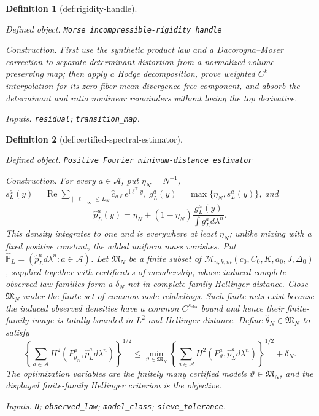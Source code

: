 \documentclass{article}
\newtheorem{definition}{Definition}
\begin{document}
\begin{definition}[def:rigidity-handle]\label{def:rigidity-handle}
\par\smallskip\noindent\emph{Defined object.} \texttt{Morse incompressible-\allowbreak{}rigidity handle}
\par\smallskip\noindent\emph{Construction.} First use the synthetic product law and a Dacorogna--Moser correction to separate determinant distortion from a normalized volume-preserving map; then apply a Hodge decomposition, prove weighted \(C^k\) interpolation for its zero-fiber-mean divergence-free component, and absorb the determinant and ratio nonlinear remainders without losing the top derivative.
\par\smallskip\noindent\emph{Inputs.} \texttt{residual}; \texttt{transition\_\allowbreak{}map}.
\end{definition}

\begin{definition}[def:certified-spectral-estimator]\label{def:certified-spectral-estimator}
\par\smallskip\noindent\emph{Defined object.} \texttt{Positive Fourier minimum-\allowbreak{}distance estimator}
\par\smallskip\noindent\emph{Construction.} For every \(a\in\mathcal A\), put \(\eta_N=N^{-1}\), \(s_L^a(y)=\operatorname{Re}\sum_{\|\ell\|_\infty\le L_N}\widehat c_{a\ell}e^{\mathrm i\ell^\top y}\), \(g_L^a(y)=\max\{\eta_N,s_L^a(y)\}\), and
\[
\widehat p_L^a(y)=\eta_N+(1-\eta_N)\frac{g_L^a(y)}{\int g_L^a d\lambda^n}.
\]
This density integrates to one and is everywhere at least \(\eta_N\); unlike mixing with a fixed positive constant, the added uniform mass vanishes. Put \(\widehat{\mathbb P}_L=(\widehat p_L^a d\lambda^n:a\in\mathcal A)\). Let \(\mathfrak M_N\) be a finite subset of \(\mathcal M_{n,k,m}(c_0,C_0,K,a_0,J,\Delta_0)\), supplied together with certificates of membership, whose induced complete observed-law families form a \(\delta_N\)-net in complete-family Hellinger distance. Close \(\mathfrak M_N\) under the finite set of common node relabelings. Such finite nets exist because the induced observed densities have a common \(C^{s_{\mathrm{obs}}}\) bound and hence their finite-family image is totally bounded in \(L^2\) and Hellinger distance. Define \(\widehat\theta_N\in\mathfrak M_N\) to satisfy
\[
\left\{\sum_{a\in\mathcal A}H^2(P_{\widehat\theta_N}^a,\widehat p_L^a d\lambda^n)\right\}^{1/2}
\le
\min_{\vartheta\in\mathfrak M_N}
\left\{\sum_{a\in\mathcal A}H^2(P_\vartheta^a,\widehat p_L^a d\lambda^n)\right\}^{1/2}+\delta_N.
\]
The optimization variables are the finitely many certified models \(\vartheta\in\mathfrak M_N\), and the displayed finite-family Hellinger criterion is the objective.
\par\smallskip\noindent\emph{Inputs.} \texttt{N}; \texttt{observed\_\allowbreak{}law}; \texttt{model\_\allowbreak{}class}; \texttt{sieve\_\allowbreak{}tolerance}.
\end{definition}
\end{document}
